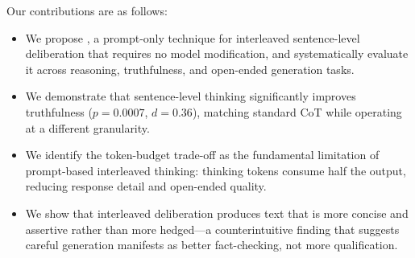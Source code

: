 Our contributions are as follows:
\begin{itemize}[leftmargin=*,itemsep=0pt,topsep=0pt]
    \item We propose \sentthink, a prompt-only technique for interleaved sentence-level deliberation that requires no model modification, and systematically evaluate it across reasoning, truthfulness, and open-ended generation tasks.
    \item We demonstrate that sentence-level thinking significantly improves truthfulness ($p{=}0.0007$, $d{=}0.36$), matching standard CoT while operating at a different granularity.
    \item We identify the token-budget trade-off as the fundamental limitation of prompt-based interleaved thinking: thinking tokens consume half the output, reducing response detail and open-ended quality.
    \item We show that interleaved deliberation produces text that is more concise and assertive rather than more hedged---a counterintuitive finding that suggests careful generation manifests as better fact-checking, not more qualification.
\end{itemize}
